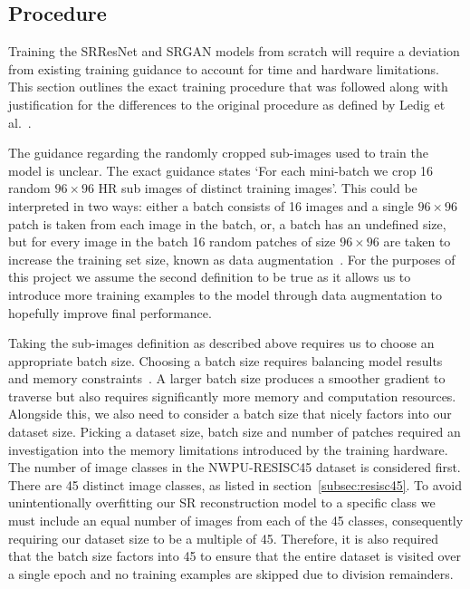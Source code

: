 \subsection{Procedure}\label{subsec:procedure}
Training the SRResNet and SRGAN models from scratch will require a deviation from existing training guidance to account for time and hardware limitations. This section outlines the exact training procedure that was followed along with justification for the differences to the original procedure as defined by Ledig et al.~\cite{srgan}.

The guidance regarding the randomly cropped sub-images used to train the model is unclear. The exact guidance states `For each mini-batch we crop 16 random $96 \times 96$ HR sub images of distinct training images'. This could be interpreted in two ways: either a batch consists of 16 images and a single $96 \times 96$ patch is taken from each image in the batch, or, a batch has an undefined size, but for every image in the batch 16 random patches of size $96 \times 96$ are taken to increase the training set size, known as data augmentation~\cite{dataAugmentation}. For the purposes of this project we assume the second definition to be true as it allows us to introduce more training examples to the model through data augmentation to hopefully improve final performance.

Taking the sub-images definition as described above requires us to choose an appropriate batch size. Choosing a batch size requires balancing model results and memory constraints~\cite{batchSizeTest}. A larger batch size produces a smoother gradient to traverse but also requires significantly more memory and computation resources. Alongside this, we also need to consider a batch size that nicely factors into our dataset size. Picking a dataset size, batch size and number of patches required an investigation into the memory limitations introduced by the training hardware. The number of image classes in the NWPU-RESISC45 dataset is considered first. There are 45 distinct image classes, as listed in section~\ref{subsec:resisc45}. To avoid unintentionally overfitting our SR reconstruction model to a specific class we must include an equal number of images from each of the 45 classes, consequently requiring our dataset size to be a multiple of 45. Therefore, it is also required that the batch size factors into 45 to ensure that the entire dataset is visited over a single epoch and no training examples are skipped due to division remainders. 

